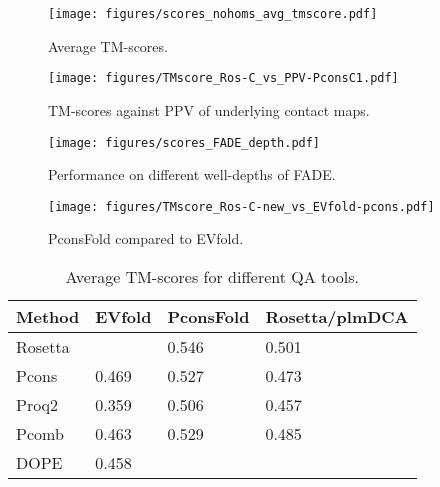 \documentclass{bioinfo}
\begin{document}
\begin{figure}[!tpb]%
    \centerline{\texttt{[image: figures/scores\_nohoms\_avg\_tmscore.pdf]}}
\caption{Average TM-scores.}\label{fig:main}
\end{figure}

\begin{figure}[!tpb]%
    \centerline{\texttt{[image: figures/TMscore\_Ros-C\_vs\_PPV-PconsC1.pdf]}}
\caption{TM-scores against PPV of underlying contact maps.}\label{fig:ppv}
\end{figure}

\begin{figure}[!tpb]%
    \centerline{\texttt{[image: figures/scores\_FADE\_depth.pdf]}}
\caption{Performance on different well-depths of FADE.}\label{fig:welldepth}
\end{figure}

\begin{figure}[!tpb]%
    \centerline{\texttt{[image: figures/TMscore\_Ros-C-new\_vs\_EVfold-pcons.pdf]}}
\caption{PconsFold compared to EVfold.}\label{fig:vs}
\end{figure}

\begin{table}
\caption{Average TM-scores for different QA tools.}
    \begin{tabular}{llll}
    Method  & EVfold & PconsFold & Rosetta/plmDCA \\ \hline
    Rosetta & ~      & 0.546     & 0.501          \\
    Pcons   & 0.469  & 0.527     & 0.473          \\
    Proq2   & 0.359  & 0.506     & 0.457          \\
    Pcomb   & 0.463  & 0.529     & 0.485          \\
    DOPE    & 0.458  & ~         & ~              \\
    \end{tabular}
\end{table}
\end{document}
